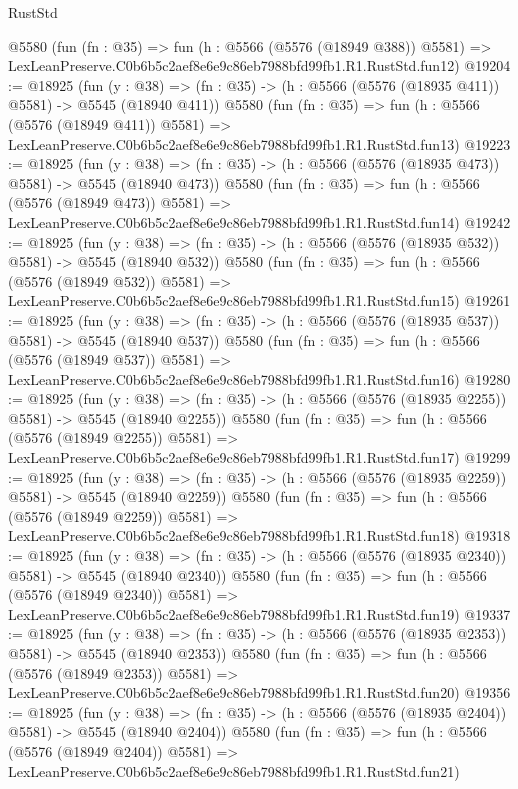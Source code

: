 \begin{lexlean}{RustStd}
\begin{coremodule}
    @5580
    (fun (fn : @35) =>
    fun (h : @5566 (@5576 (@18949 @388)) @5581) =>
    LexLeanPreserve.C0b6b5c2aef8e6e9c86eb7988bfd99fb1.R1.RustStd.fun12)
@19204 := @18925
    (fun (y : @38) => (fn : @35) -> (h : @5566 (@5576 (@18935 @411)) @5581) -> @5545 (@18940 @411))
    @5580
    (fun (fn : @35) =>
    fun (h : @5566 (@5576 (@18949 @411)) @5581) =>
    LexLeanPreserve.C0b6b5c2aef8e6e9c86eb7988bfd99fb1.R1.RustStd.fun13)
@19223 := @18925
    (fun (y : @38) => (fn : @35) -> (h : @5566 (@5576 (@18935 @473)) @5581) -> @5545 (@18940 @473))
    @5580
    (fun (fn : @35) =>
    fun (h : @5566 (@5576 (@18949 @473)) @5581) =>
    LexLeanPreserve.C0b6b5c2aef8e6e9c86eb7988bfd99fb1.R1.RustStd.fun14)
@19242 := @18925
    (fun (y : @38) => (fn : @35) -> (h : @5566 (@5576 (@18935 @532)) @5581) -> @5545 (@18940 @532))
    @5580
    (fun (fn : @35) =>
    fun (h : @5566 (@5576 (@18949 @532)) @5581) =>
    LexLeanPreserve.C0b6b5c2aef8e6e9c86eb7988bfd99fb1.R1.RustStd.fun15)
@19261 := @18925
    (fun (y : @38) => (fn : @35) -> (h : @5566 (@5576 (@18935 @537)) @5581) -> @5545 (@18940 @537))
    @5580
    (fun (fn : @35) =>
    fun (h : @5566 (@5576 (@18949 @537)) @5581) =>
    LexLeanPreserve.C0b6b5c2aef8e6e9c86eb7988bfd99fb1.R1.RustStd.fun16)
@19280 := @18925
    (fun (y : @38) =>
    (fn : @35) -> (h : @5566 (@5576 (@18935 @2255)) @5581) -> @5545 (@18940 @2255))
    @5580
    (fun (fn : @35) =>
    fun (h : @5566 (@5576 (@18949 @2255)) @5581) =>
    LexLeanPreserve.C0b6b5c2aef8e6e9c86eb7988bfd99fb1.R1.RustStd.fun17)
@19299 := @18925
    (fun (y : @38) =>
    (fn : @35) -> (h : @5566 (@5576 (@18935 @2259)) @5581) -> @5545 (@18940 @2259))
    @5580
    (fun (fn : @35) =>
    fun (h : @5566 (@5576 (@18949 @2259)) @5581) =>
    LexLeanPreserve.C0b6b5c2aef8e6e9c86eb7988bfd99fb1.R1.RustStd.fun18)
@19318 := @18925
    (fun (y : @38) =>
    (fn : @35) -> (h : @5566 (@5576 (@18935 @2340)) @5581) -> @5545 (@18940 @2340))
    @5580
    (fun (fn : @35) =>
    fun (h : @5566 (@5576 (@18949 @2340)) @5581) =>
    LexLeanPreserve.C0b6b5c2aef8e6e9c86eb7988bfd99fb1.R1.RustStd.fun19)
@19337 := @18925
    (fun (y : @38) =>
    (fn : @35) -> (h : @5566 (@5576 (@18935 @2353)) @5581) -> @5545 (@18940 @2353))
    @5580
    (fun (fn : @35) =>
    fun (h : @5566 (@5576 (@18949 @2353)) @5581) =>
    LexLeanPreserve.C0b6b5c2aef8e6e9c86eb7988bfd99fb1.R1.RustStd.fun20)
@19356 := @18925
    (fun (y : @38) =>
    (fn : @35) -> (h : @5566 (@5576 (@18935 @2404)) @5581) -> @5545 (@18940 @2404))
    @5580
    (fun (fn : @35) =>
    fun (h : @5566 (@5576 (@18949 @2404)) @5581) =>
    LexLeanPreserve.C0b6b5c2aef8e6e9c86eb7988bfd99fb1.R1.RustStd.fun21)

\end{coremodule}
\end{lexlean}
